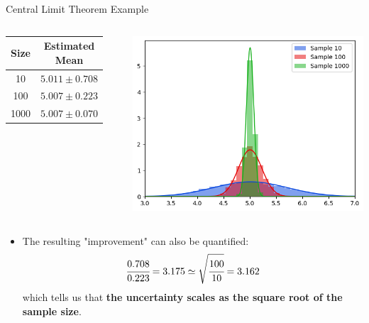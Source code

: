 \documentclass{beamer}
\begin{document}
\begin{frame}[fragile]{Central Limit Theorem Example}
\begin{columns}
         \begin{table}
            \centering
            \begin{tabular}{cc}
                Size & Estimated Mean \\
                \hline
                10 & $5.011 \pm 0.708$  \\
                100 & $5.007 \pm 0.223$ \\
                1000 & $5.007 \pm 0.070$\\
            \end{tabular}
            \label{tab:my_label}
        \end{table}
        \includegraphics[width=0.8\linewidth]{images/sample_mean}
\end{columns}
\begin{itemize}
    \item The resulting "improvement" can also be quantified:
    \begin{equation}
    \cfrac{0.708}{0.223} = 3.175 \simeq \sqrt{\cfrac{100}{10}} = 3.162
    \label{eq:clt}
    \end{equation}
    which tells us that \textbf{the uncertainty scales as the square root of the sample size}.
\end{itemize}
\end{frame}
\end{document}
